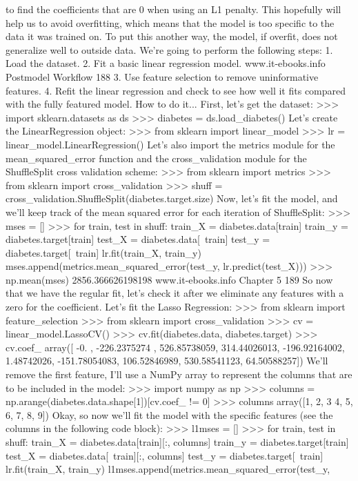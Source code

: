 to find the coefficients that are 0 when using an L1 penalty. This hopefully will help us to avoid
overfitting, which means that the model is too specific to the data it was trained on. To put this
another way, the model, if overfit, does not generalize well to outside data.
We're going to perform the following steps:
1. Load the dataset.
2. Fit a basic linear regression model.
www.it-ebooks.info
Postmodel Workflow
188
3. Use feature selection to remove uninformative features.
4. Refit the linear regression and check to see how well it fits compared with the fully
featured model.
How to do it...
First, let's get the dataset:
>>> import sklearn.datasets as ds
>>> diabetes = ds.load_diabetes()
Let's create the LinearRegression object:
>>> from sklearn import linear_model
>>> lr = linear_model.LinearRegression()
Let's also import the metrics module for the mean_squared_error function and the
cross_validation module for the ShuffleSplit cross validation scheme:
>>> from sklearn import metrics
>>> from sklearn import cross_validation
>>> shuff = cross_validation.ShuffleSplit(diabetes.target.size)
Now, let's fit the model, and we'll keep track of the mean squared error for each iteration
of ShuffleSplit:
>>> mses = []
>>> for train, test in shuff:
train_X = diabetes.data[train]
train_y = diabetes.target[train]
test_X = diabetes.data[~train]
test_y = diabetes.target[~train]
lr.fit(train_X, train_y)
mses.append(metrics.mean_squared_error(test_y,
lr.predict(test_X)))
>>> np.mean(mses)
2856.366626198198
www.it-ebooks.info
Chapter 5
189
So now that we have the regular fit, let's check it after we eliminate any features with a zero
for the coefficient. Let's fit the Lasso Regression:
>>> from sklearn import feature_selection
>>> from sklearn import cross_validation
>>> cv = linear_model.LassoCV()
>>> cv.fit(diabetes.data, diabetes.target)
>>> cv.coef_
array([ -0. , -226.2375274 , 526.85738059, 314.44026013,
-196.92164002, 1.48742026, -151.78054083, 106.52846989,
530.58541123, 64.50588257])
We'll remove the first feature, I'll use a NumPy array to represent the columns that are to be
included in the model:
>>> import numpy as np
>>> columns = np.arange(diabetes.data.shape[1])[cv.coef_ != 0]
>>> columns
array([1, 2, 3 4, 5, 6, 7, 8, 9])
Okay, so now we'll fit the model with the specific features (see the columns in the following
code block):
>>> l1mses = []
>>> for train, test in shuff:
train_X = diabetes.data[train][:, columns]
train_y = diabetes.target[train]
test_X = diabetes.data[~train][:, columns]
test_y = diabetes.target[~train]
lr.fit(train_X, train_y)
l1mses.append(metrics.mean_squared_error(test_y,
